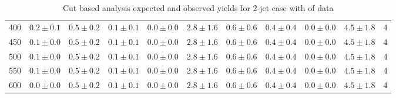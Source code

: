 \begin{table}
{\begin{center}
\begin{tabular}{l c c c c c c c c c c }
400 & $0.2\pm0.1$ & $0.5\pm0.2$ & $0.1\pm0.1$ & $0.0\pm0.0$ & $2.8\pm1.6$ & $0.6\pm0.6$ & $0.4\pm0.4$ & $0.0\pm0.0$ & $4.5\pm1.8$ & 4 \\
450 & $0.1\pm0.0$ & $0.5\pm0.2$ & $0.1\pm0.1$ & $0.0\pm0.0$ & $2.8\pm1.6$ & $0.6\pm0.6$ & $0.4\pm0.4$ & $0.0\pm0.0$ & $4.5\pm1.8$ & 4 \\
500 & $0.1\pm0.0$ & $0.5\pm0.2$ & $0.1\pm0.1$ & $0.0\pm0.0$ & $2.8\pm1.6$ & $0.6\pm0.6$ & $0.4\pm0.4$ & $0.0\pm0.0$ & $4.5\pm1.8$ & 4 \\
550 & $0.1\pm0.0$ & $0.5\pm0.2$ & $0.1\pm0.1$ & $0.0\pm0.0$ & $2.8\pm1.6$ & $0.6\pm0.6$ & $0.4\pm0.4$ & $0.0\pm0.0$ & $4.5\pm1.8$ & 4 \\
600 & $0.0\pm0.0$ & $0.5\pm0.2$ & $0.1\pm0.1$ & $0.0\pm0.0$ & $2.8\pm1.6$ & $0.6\pm0.6$ & $0.4\pm0.4$ & $0.0\pm0.0$ & $4.5\pm1.8$ & 4 \\
\hline
\end{tabular}
\end{center}
}
\caption{Cut based analysis expected and observed yields for 2-jet case with \intlumi of data}
\label{tab:cutbase_inputs_2j_data}
\end{table}


\cleardoublepage
